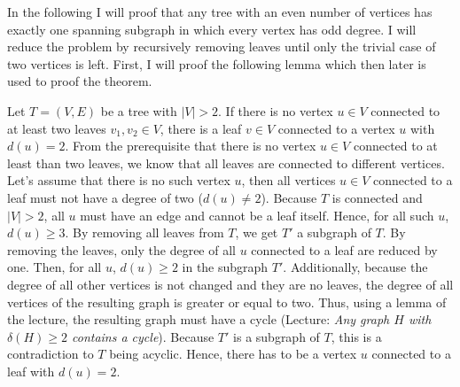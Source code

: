 \documentclass[a4paper]{article}
\begin{document}
	\begin{solution}{6}
		In the following I will proof that any tree with an even number of vertices has exactly one spanning subgraph in which every vertex has odd degree. 
		I will reduce the problem by recursively removing leaves until only the trivial case of two vertices is left. 
		First, I will proof the following lemma which then later is used to proof the theorem. 
			
		\begin{lemma}{Let $T=(V,E)$ be a tree with $|V|>2$. If there is no vertex $u \in V$ connected to at least two leaves $v_1, v_2 \in V$, there is a leaf $v \in V$ connected to a vertex $u$ with $d(u) = 2$.}
			From the prerequisite that there is no vertex $u \in V$ connected to at least than two leaves, we know that all leaves are connected to different vertices. 
			Let's assume that there is no such vertex $u$, then all vertices $u \in V$ connected to a leaf must not have a degree of two ($d(u) \neq 2$). 
			Because $T$ is connected and $|V|>2$, all $u$ must have an edge and cannot be a leaf itself. Hence, for all such $u$, $d(u) \geq 3$. 
			By removing all leaves from $T$, we get $T'$ a subgraph of $T$. By removing the leaves, only the degree of all $u$ connected to a leaf are reduced by one. 
			Then, for all $u$, $d(u) \geq 2$ in the subgraph $T'$. 
			Additionally, because the degree of all other vertices is not changed and they are no leaves, the degree of all vertices of the resulting graph is greater or equal to two. 
			Thus, using a lemma of the lecture, the resulting graph must have a cycle (Lecture: \emph{Any graph $H$ with $\delta(H) \geq 2$ contains a cycle}). 
			Because $T'$ is a subgraph of $T$, this is a contradiction to $T$ being acyclic. Hence, there has to be a vertex $u$ connected to a leaf with $d(u)=2$. 		
		\end{lemma}
					

\end{solution}
\end{document}
